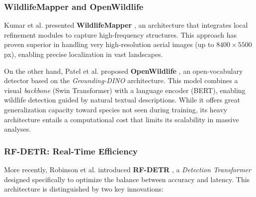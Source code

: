 \subsubsection*{WildlifeMapper and OpenWildlife}
Kumar et al. presented \textbf{WildlifeMapper} \cite{wildlife-mapper}, an architecture that integrates local refinement modules to capture high-frequency structures. This approach has proven superior in handling very high-resolution aerial images (up to $8400 \times 5500$ px), enabling precise localization in vast landscapes.

On the other hand, Patel et al. proposed \textbf{OpenWildlife} \cite{open-wildlife}, an open-vocabulary detector based on the \textit{Grounding-DINO} architecture. This model combines a visual \textit{backbone} (Swin Transformer) with a language encoder (BERT), enabling wildlife detection guided by natural textual descriptions. While it offers great generalization capacity toward species not seen during training, its heavy architecture entails a computational cost that limits its scalability in massive analyses.

\subsubsection*{RF-DETR: Real-Time Efficiency}
More recently, Robinson et al. introduced \textbf{RF-DETR} \cite{rf-detr}, a \textit{Detection Transformer} designed specifically to optimize the balance between accuracy and latency. This architecture is distinguished by two key innovations:

